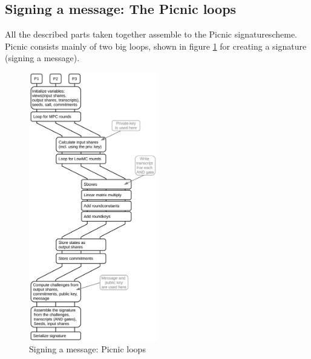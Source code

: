 \documentclass[]{article}
\begin{document}
\subsection{Signing a message: The Picnic loops}
All the described parts taken together assemble to the Picnic signaturescheme. Picnic consists mainly of two big loops, shown in figure \ref{fig:mainloops} for creating a signature (signing a message).
\begin{figure}[htbp]
\center
\includegraphics[width=0.5\textwidth]{pics/mainloops.pdf}
\caption{Signing a message: Picnic loops}
\label{fig:mainloops}
\end{figure}\\
\end{document}
